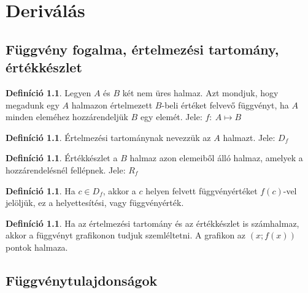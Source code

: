 \documentclass[twoside,12pt]{report}
\theoremstyle{definition}
\newtheorem{definition}[theorem]{Definíció}
\begin{document}
\chapter{Deriválás}
\section{Függvény fogalma, értelmezési tartomány, értékkészlet}
	\begin{definition}
		Legyen $A$ és $B$ két nem üres halmaz. Azt mondjuk, hogy megadunk egy $A$ halmazon értelmezett $B$-beli értéket felvevő függvényt, ha $A$ minden eleméhez hozzárendeljük $B$ egy elemét. Jele: $f:\ A\mapsto B$
	\end{definition}
	\begin{definition}
		Értelmezési tartománynak nevezzük az $A$ halmazt. Jele: $D_f$
	\end{definition}
	\begin{definition}
		Értékkészlet a $B$ halmaz azon elemeiből álló halmaz, amelyek a hozzárendelésnél fellépnek. Jele: $R_f$
	\end{definition}
	\begin{definition}
		Ha $c\in D_f$, akkor a $c$ helyen felvett függvényértéket $f(c)$-vel jelöljük, ez a helyettesítési, vagy függvényérték.
	\end{definition}
	\begin{definition}
		Ha az értelmezési tartomány és az értékkészlet is számhalmaz, akkor a függvényt grafikonon tudjuk szemléltetni. A grafikon az $(x;f(x))$ pontok halmaza.
	\end{definition}
\section{Függvénytulajdonságok}
\end{document}
